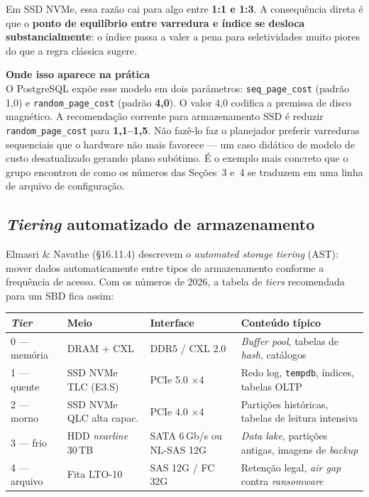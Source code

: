 \documentclass[11pt,a4paper]{article}
\newcommand{\destaque}[2]{%
  \begin{center}\begin{minipage}{0.96\textwidth}
  \colorbox{fundo}{\begin{minipage}{\dimexpr\linewidth-2\fboxsep}
  \vspace{3pt}\textbf{\color{azul}#1}\\[2pt]\small #2\vspace{4pt}
  \end{minipage}}\end{minipage}\end{center}}
\begin{document}
Em SSD NVMe, essa razão cai para algo entre \textbf{1:1 e 1:3}. A consequência direta é que
o \textbf{ponto de equilíbrio entre varredura e índice se desloca substancialmente}: o
índice passa a valer a pena para seletividades muito piores do que a regra clássica sugere.

\destaque{Onde isso aparece na prática}{%
O PostgreSQL expõe esse modelo em dois parâmetros: \texttt{seq\_page\_cost} (padrão 1,0) e
\texttt{random\_page\_cost} (padrão \textbf{4,0}). O valor 4,0 codifica a premissa de disco
magnético. A recomendação corrente para armazenamento SSD é reduzir
\texttt{random\_page\_cost} para \textbf{1,1--1,5}. Não fazê-lo faz o planejador preferir
varreduras sequenciais que o hardware não mais favorece --- um caso didático de modelo de
custo desatualizado gerando plano subótimo. É o exemplo mais concreto que o grupo
encontrou de como os números das Seções~3 e~4 se traduzem em uma linha de arquivo de
configuração.}

\subsection{\emph{Tiering} automatizado de armazenamento}

Elmasri \& Navathe (§16.11.4) descrevem o \emph{automated storage tiering} (AST): mover
dados automaticamente entre tipos de armazenamento conforme a frequência de acesso. Com os
números de 2026, a tabela de \emph{tiers} recomendada para um SBD fica assim:

\begin{center}\small
\begin{tabular}{@{}p{2.6cm}p{3.5cm}p{2.6cm}p{6.0cm}@{}}
\toprule
\textbf{\emph{Tier}} & \textbf{Meio} & \textbf{Interface} & \textbf{Conteúdo típico} \\
\midrule
0 --- memória & DRAM $+$ CXL & DDR5 / CXL 2.0 & \emph{Buffer pool}, tabelas de \emph{hash}, catálogos \\
1 --- quente & SSD NVMe TLC (E3.S) & PCIe 5.0 $\times$4 & Redo log, \texttt{tempdb}, índices, tabelas OLTP \\
2 --- morno & SSD NVMe QLC alta capac. & PCIe 4.0 $\times$4 & Partições históricas, tabelas de leitura intensiva \\
3 --- frio & HDD \emph{nearline} 30\,TB & SATA 6\,Gb/s ou NL-SAS 12G & \emph{Data lake}, partições antigas, imagens de \emph{backup} \\
4 --- arquivo & Fita LTO-10 & SAS 12G / FC 32G & Retenção legal, \emph{air gap} contra \emph{ransomware} \\
\bottomrule
\end{tabular}
\end{center}
\end{document}
